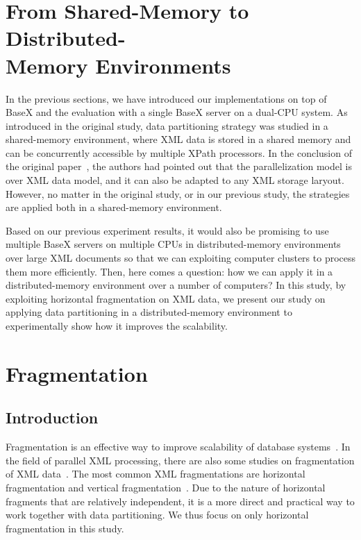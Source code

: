 

\section{From Shared-Memory to Distributed-\\Memory Environments}

In the previous sections, we have introduced our implementations on top of BaseX
and the evaluation with a single BaseX server on a dual-CPU system. As
introduced in the original study, data partitioning strategy was studied in a
shared-memory environment, where XML data is stored in a shared memory and can
be concurrently accessible by multiple XPath processors. In the conclusion of
the original paper~\cite{BoLS09},  the authors had pointed out that the
parallelization model is over XML data model, and it can also be adapted to any
XML storage laryout. However,  no matter in the original study, or in our
previous study, the strategies  are applied both in a shared-memory environment. 

Based on our previous experiment results, it would also be promising to use
multiple BaseX servers on multiple CPUs in distributed-memory environments over
large XML documents so that we can exploiting computer clusters to process 
them more efficiently. Then, here comes a question:  how we can apply it in a
distributed-memory environment over a number of computers? 
In this study, by exploiting horizontal fragmentation on XML data, we present our
study on applying data partitioning in a distributed-memory  environment to
experimentally show how it improves the scalability.


\section{Fragmentation}

\subsection{Introduction}
Fragmentation is an effective way to improve scalability of database
systems~\cite{navathe1995mixed, hauglid2010dyfram, khan2010new}.  In the field
of parallel XML processing, there are also some studies on  fragmentation of XML
data~\cite{kling11:dist_xml, KlOD10}.  The most common XML fragmentations are
horizontal fragmentation and vertical fragmentation~\cite{kling11:dist_xml}. Due
to the nature of horizontal fragments that are  relatively independent, it is a
more direct and practical way to work together with data partitioning. We thus
focus on only horizontal fragmentation in this study.

